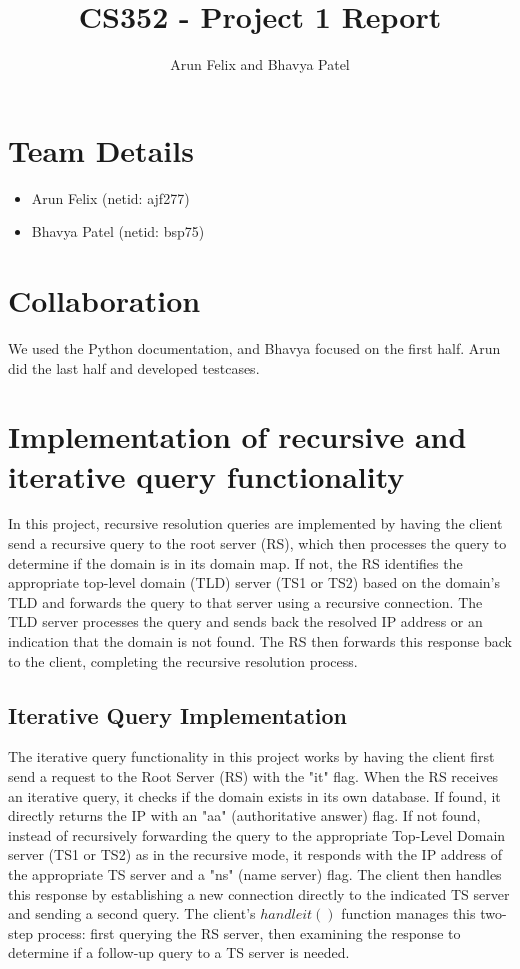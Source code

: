 \documentclass{article}
\begin{document}
\title{CS352 - Project 1 Report}
\author{Arun Felix and Bhavya Patel}
\maketitle

\section{Team Details}

\begin{itemize}
    \item Arun Felix (netid: ajf277)
    \item Bhavya Patel (netid: bsp75)
\end{itemize}

\section{Collaboration}

We used the Python documentation, and Bhavya focused on the first half. Arun did the last half and developed testcases.

\section{Implementation of recursive and iterative query functionality}

In this project, recursive resolution queries are implemented by having the client send a recursive query to the root server (RS), which then processes the query to determine if the domain is in its domain map. 
If not, the RS identifies the appropriate top-level domain (TLD) server (TS1 or TS2) based on the domain's TLD and forwards the query to that server using a recursive connection. 
The TLD server processes the query and sends back the resolved IP address or an indication that the domain is not found. 
The RS then forwards this response back to the client, completing the recursive resolution process.

\subsection{Iterative Query Implementation}

The iterative query functionality in this project works by having the client first send a request to the Root Server (RS) with the "it" flag. When the RS receives an iterative query, it checks if the domain exists in its own database. 
If found, it directly returns the IP with an "aa" (authoritative answer) flag. 
If not found, instead of recursively forwarding the query to the appropriate Top-Level Domain server (TS1 or TS2) as in the recursive mode, it responds with the IP address of the appropriate TS server and a "ns" (name server) flag. 
The client then handles this response by establishing a new connection directly to the indicated TS server and sending a second query. The client's $handleit()$ function manages this two-step process: first querying the RS server, then examining the response to determine if a follow-up query to a TS server is needed. 
\end{document}
